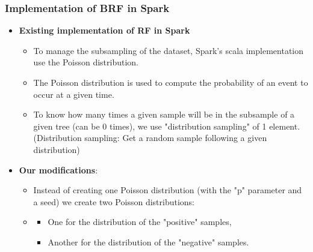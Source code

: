 \documentclass[slidestop,compress,red,mathserif]{beamer}
\begin{document}
\begin{frame}
\frametitle{Implementation of BRF in Spark}
\begin{itemize}
  \item[] \textbf{Existing implementation of RF in Spark}
    \begin{itemize}
    	\item To manage the subsampling of the dataset, Spark's scala implementation use the Poisson distribution.
      \item The Poisson distribution is used to compute the probability of an event to occur at a given time.
    	\item To know how many times a given sample will be in the subsample of a given tree (can be 0 times), we use "distribution sampling" of 1 element. (Distribution sampling: Get a random sample following a given distribution)
    \end{itemize}
  \item[] \textbf{Our modifications}:
    \begin{itemize}
      \item Instead of creating one Poisson distribution (with the "p" parameter and a seed) we create two Poisson distributions:
    	\item[]
      \begin{itemize}
      	\item One for the distribution of the "positive" samples,
        \item Another for the distribution of the "negative" samples.
      \end{itemize}
    \end{itemize}
\end{itemize}
\end{frame}
\end{document}
